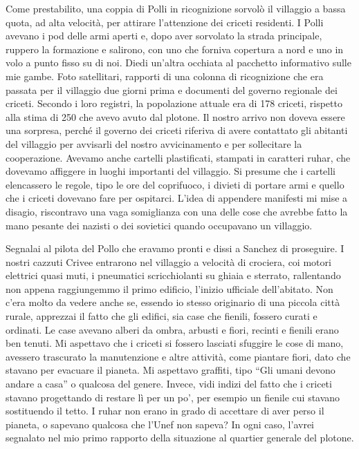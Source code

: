 Come prestabilito, una coppia di Polli in ricognizione sorvolò il
villaggio a bassa quota, ad alta velocità, per attirare l'attenzione dei
criceti residenti. I Polli avevano i pod delle armi aperti e, dopo aver
sorvolato la strada principale, ruppero la formazione e salirono, con
uno che forniva copertura a nord e uno in volo a punto fisso su di noi.
Diedi un'altra occhiata al pacchetto informativo sulle mie gambe. Foto
satellitari, rapporti di una colonna di ricognizione che era passata per
il villaggio due giorni prima e documenti del governo regionale dei
criceti. Secondo i loro registri, la popolazione attuale era di 178
criceti, rispetto alla stima di 250 che avevo avuto dal plotone. Il
nostro arrivo non doveva essere una sorpresa, perché il governo dei
criceti riferiva di avere contattato gli abitanti del villaggio per
avvisarli del nostro avvicinamento e per sollecitare la cooperazione.
Avevamo anche cartelli plastificati, stampati in caratteri ruhar, che
dovevamo affiggere in luoghi importanti del villaggio. Si presume che i
cartelli elencassero le regole, tipo le ore del coprifuoco, i divieti di
portare armi e quello che i criceti dovevano fare per ospitarci. L'idea
di appendere manifesti mi mise a disagio, riscontravo una vaga
somiglianza con una delle cose che avrebbe fatto la mano pesante dei
nazisti o dei sovietici quando occupavano un villaggio.

Segnalai al pilota del Pollo che eravamo pronti e dissi a Sanchez di
proseguire. I nostri cazzuti Crivee entrarono nel villaggio a velocità
di crociera, coi motori elettrici quasi muti, i pneumatici
scricchiolanti su ghiaia e sterrato, rallentando non appena raggiungemmo
il primo edificio, l'inizio ufficiale dell'abitato. Non c'era molto da
vedere anche se, essendo io stesso originario di una piccola città
rurale, apprezzai il fatto che gli edifici, sia case che fienili,
fossero curati e ordinati. Le case avevano alberi da ombra, arbusti e
fiori, recinti e fienili erano ben tenuti. Mi aspettavo che i criceti si
fossero lasciati sfuggire le cose di mano, avessero trascurato la
manutenzione e altre attività, come piantare fiori, dato che stavano per
evacuare il pianeta. Mi aspettavo graffiti, tipo ``Gli umani devono
andare a casa'' o qualcosa del genere. Invece, vidi indizi del fatto che
i criceti stavano progettando di restare lì per un po', per esempio un
fienile cui stavano sostituendo il tetto. I ruhar non erano in grado di
accettare di aver perso il pianeta, o sapevano qualcosa che l'Unef non
sapeva? In ogni caso, l'avrei segnalato nel mio primo rapporto della
situazione al quartier generale del plotone.

